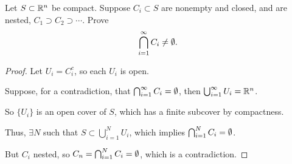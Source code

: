 \documentclass[../quiz3]{subfiles}
\begin{document}
\begin{problem}[4]
Let $S\subset \mathbb{R}^{n}$ be compact. Suppose $C_i\subset S$ are nonempty and closed, and are nested, $C_1 \supset C_2 \supset \cdots$. Prove \[
	\bigcap_{i=1}^{\infty}C_i \neq \emptyset
	.\]
\end{problem}
\begin{proof}



	Let $U_i=C_i^c$, so each  $U_i$ is open.

	Suppose, for a contradiction, that  $\bigcap_{i=1}^{\infty}C_i = \emptyset $, then $\bigcup_{i=1}^{\infty}U_i = \mathbb{R}^{n}$.

	So $\{U_i\} $ is an open cover of $S$, which has a finite subcover by compactness.

	Thus,  $\exists N$ such that $S\subset \bigcup_{i=1}^{N} U_i$, which implies $\bigcap_{i=1}^{N} C_i = \emptyset$.

	But $C_i$ nested, so $C_n=\bigcap_{i=1}^{N} C_i = \emptyset $, which is a contradiction.
\end{proof}
\end{document}
